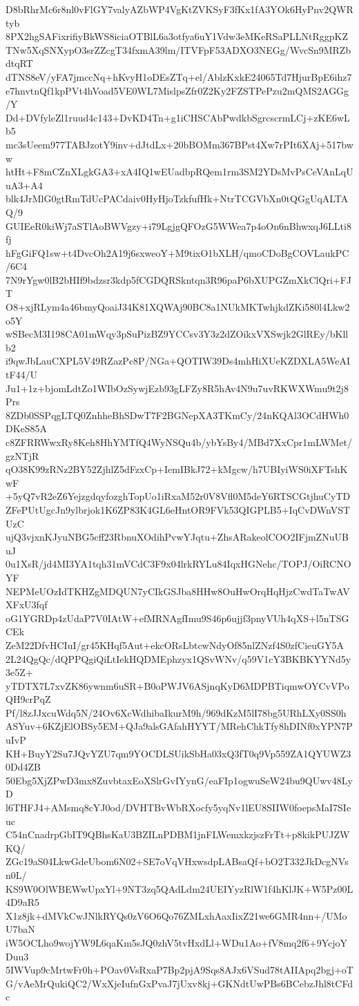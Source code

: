 D8bRhrMc6r8nl0vFlGY7valyAZbWP4VgKtZVKSyF3fKx1fA3YOk6HyPnv2QWRtyb
8PX2hgSAFixrifiyBkWS8iciaOTBlL6a3otfya6uY1Vdw3eMKeRSaPLLNtRggpKZ
TNw5XqSNXypO3srZZcgT34fxmA39lm/ITVFpF53ADXO3NEGg/WvcSn9MRZbdtqRT
dTNS8eV/yFA7jmccNq+hKvyH1oDEsZTq+el/AblzKxkE24065Td7HjurBpE6ihz7
e7hnvtnQf1kpPVt4hVoad5VE0WL7MislpsZfr0Z2Ky2FZSTPePzu2mQMS2AGGg/Y
Dd+DVfyleZl1ruud4c143+DvKD4Tn+g1iCHSCAbPwdkbSgrcscrmLCj+zKE6wLb5
mc3sUeem977TABJzotY9inv+dJtdLx+20bBOMm367BPst4Xw7rPIt6XAj+517bww
htHt+F8mCZnXLgkGA3+xA4IQ1wEUadbpRQem1rm3SM2YDsMvPsCeVAnLqUuA3+A4
blk4JrMlG0gtRmTdUcPACdaiv0HyHjoTzkfufHk+NtrTCGVbXn0tQGgUqALTAQ/9
GUIEeR0kiWj7aSTlAoBWVgzy+i79LgjgQFOzG5WWea7p4oOn6nBhwxqJ6LLti8fj
hFgGiFQ1sw+t4DvcOh2A19j6sxweoY+M9tixO1bXLH/qmoCDoBgCOVLaukPC/6C4
7N9rYgw0lB2bHIf9bdzsr3kdp5fCGDQRSkntqn3R96paP6bXUPGZmXkClQri+FJT
O8+xjRLym4a46bmyQoaiJ34K81XQWAj90BC8a1NUkMKTwhjkdZKi580l4Lkw2o5Y
wSBecM3I198CA01mWqy3pSuPizBZ9YCCsv3Y3z2dZOikxVXSwjk2GlREy/bKllb2
i9qwJbLauCXPL5V49RZazPc8P/NGa+QOTIW39Ds4mhHiXUeKZDXLA5WeAItF44/U
Ju1+1z+bjomLdtZo1WIbOzSywjEzb93gLFZy8R5hAv4N9u7uvRKWXWmu9t2j8Prs
8ZDb0SSPqgLTQ0ZnhheBhSDwT7F2BGNepXA3TKmCy/24nKQAl3OCdHWh0DKeS85A
c8ZFRRWwxRy8Keh8HhYMTfQ4WyNSQu4b/ybYsBy4/MBd7XxCpr1mLWMet/gzNTjR
qO38K99zRNz2BY52ZjhlZ5dFzxCp+IemIBkJ72+kMgcw/h7UBIyiWS0iXFTshKwF
+5yQ7vR2eZ6YejzgdqyfozghTopUo1iRxaM52r0V8Vfl0M5deY6RTSCGtjhuCyTD
ZFePUtUgcJn9ylbrjok1K6ZP83K4GL6eHntOR9FVk53QIGPLB5+IqCvDWnVSTUzC
ujQ3vjxnKJyuNBG5cff23RbnuXOdihPvwYJqtu+ZhsARakeolCOO2IFjmZNuUBuJ
0u1XsR/jd4MI3YA1tqh31mVCdC3F9x04lrkRYLu84IqxHGNehc/TOPJ/OiRCNOYF
NEPMeUOzIdTKHZgMDQUN7yCIkGSJba8HHw8OuHwOrqHqHjzCwdTaTwAVXFxU3fqf
oG1YGRDp4zUdaP7V0IAtW+efMRNAgfImu9S46p6ujjf3pnyVUh4qXS+l5nTSGCEk
ZeM22DfvHCIuI/gr45KHqf5Aut+ekcORsLbtcwNdyOf85nlZNzf4S0zfCieuGY5A
2L24QgQc/dQPPQgiQiLtIekHQDMEphzyx1QSvWNv/q59V1cY3BKBKYYNd5y3e5Z+
yTDTX7L7xvZK86ywnm6uSR+B0oPWJV6ASjnqKyD6MDPBTiqmwOYCvVPoQH9crPqZ
Pf/l8zJJxcuWdq5N/24Ov6XcWdhibaIkurM9h/969dKzM5lI78bg5URhLXy0SS0h
ASYuv+6KZjElOBSy5EM+QJa9alsGAfahHYYT/MRehChkTfy8hDINf0xYPN7PuIvP
KH+BuyY2Su7JQvYZU7qm9YOCDLSUikSbHa03xQ3fT0q9Vp559ZA1QYUWZ30Dd4ZB
50Ebg5XjZPwD3mx8ZuvbtaxEoXSlrGvIYynG/eaFIp1ogwuSeW24bu9QUwv48LyD
l6THFJ4+AMsmq8cYJ0od/DVHTBvWbRXocfy5yqNv1lEU8SIIW0foepsMaI7SIeuc
C54nCnadrpGbIT9QBhsKaU3BZILnPDBM1jnFLWemxkzjszFrTt+p8kikPUJZWKQ/
ZGc19aS04LkwGdeUbom6N02+SE7oVqVHxwsdpLABsaQf+bO2T332JkDcgNVsn0L/
KS9W0OlWBEWwUpxYl+9NT3zq5QAdLdm24UEIYyzRlW1f4hKlJK+W5Pz00L4D9aR5
X1z8jk+dMVkCwJNlkRYQs0zV6O6Qo76ZMLxhAaxIixZ21we6GMR4nn+/UMoU7baN
iW5OCLho9wojYW9L6qaKm5sJQ0zhV5tvHxdLl+WDu1Ao+fV8mq2f6+9YcjoYDuu3
5IWVup9cMrtwFr0h+POav0VsRxaP7Bp2pjA9Sqs8AJx6VSud78tAIIApq2bgj+oT
G/vAeMrQukiQC2/WxXjeIufnGxPvaJ7jUxv8kj+GKNdtUwPBs6BCebzJhl8tCFdc
